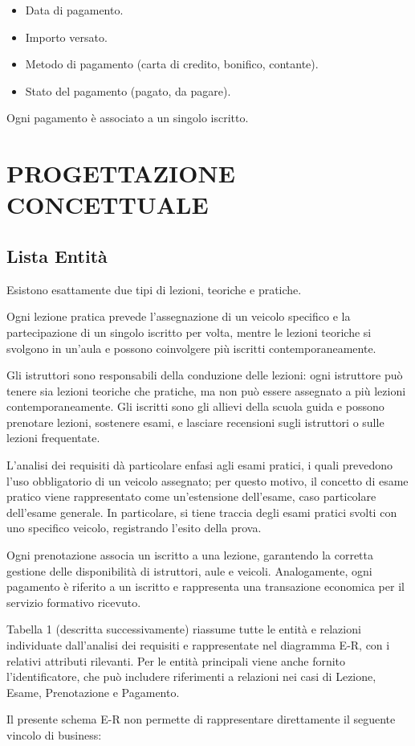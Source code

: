 \documentclass[10pt,twoside]{article}
\begin{document}
{    \begin{itemize}
        \item Data di pagamento.
        \item Importo versato.
        \item Metodo di pagamento (carta di credito, bonifico, contante).
        \item Stato del pagamento (pagato, da pagare).
    \end{itemize}

    Ogni pagamento è associato a un singolo iscritto.

}

\newpage

\section{PROGETTAZIONE CONCETTUALE}{
    \subsection{Lista Entità}{
        Esistono esattamente due tipi di lezioni, teoriche e pratiche.

        Ogni lezione pratica prevede l'assegnazione di un veicolo specifico e la partecipazione di un singolo iscritto per volta, mentre le lezioni teoriche si svolgono in un'aula e possono coinvolgere più iscritti contemporaneamente.

        Gli istruttori sono responsabili della conduzione delle lezioni: ogni istruttore può tenere sia lezioni teoriche che pratiche, ma non può essere assegnato a più lezioni contemporaneamente.
        Gli iscritti sono gli allievi della scuola guida e possono prenotare lezioni, sostenere esami, e lasciare recensioni sugli istruttori o sulle lezioni frequentate.

        L’analisi dei requisiti dà particolare enfasi agli esami pratici, i quali prevedono l’uso obbligatorio di un veicolo assegnato; per questo motivo, il concetto di esame pratico viene rappresentato come un'estensione dell'esame, caso particolare dell'esame generale.
        In particolare, si tiene traccia degli esami pratici svolti con uno specifico veicolo, registrando l’esito della prova.

        Ogni prenotazione associa un iscritto a una lezione, garantendo la corretta gestione delle disponibilità di istruttori, aule e veicoli.
        Analogamente, ogni pagamento è riferito a un iscritto e rappresenta una transazione economica per il servizio formativo ricevuto.

        Tabella 1 (descritta successivamente) riassume tutte le entità e relazioni individuate dall'analisi dei requisiti e rappresentate nel diagramma E-R, con i relativi attributi rilevanti.
        Per le entità principali viene anche fornito l'identificatore, che può includere riferimenti a relazioni nei casi di Lezione, Esame, Prenotazione e Pagamento.

        Il presente schema E-R non permette di rappresentare direttamente il seguente vincolo di business:
    }
}
\end{document}
